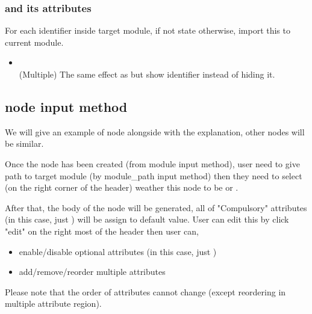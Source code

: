 \documentclass[11pt, a4paper]{article}
\begin{document}
\subsubsection{\kHideByDefault and its attributes}
For each identifier inside target module, if not state otherwise, import this to current module.
\begin{itemize}
    \item \kShow {} \\
    (Multiple) The same effect as \kHide but show identifier instead of hiding it.
\end{itemize}

\subsection{node input method}

We will give an example of \kOpen node alongside with the explanation, other nodes will be similar.

Once the \kOpen node has been created (from module input method), user need to give path to target module (by module\_path input method) then they need to select (on the right corner of the header) weather this \kOpen node to be \kShowByDefault or \kHideByDefault.

After that, the body of the node will be generated, all of "Compulsory" attributes (in this case, just \kRecursive) will be assign to default value. User can edit this by click "edit" on the right most of the header then user can,

\begin{itemize}
    \item enable/disable optional attributes (in this case, just \kComment) 
    \item add/remove/reorder multiple attributes
\end{itemize}

Please note that the order of attributes cannot change (except reordering in multiple attribute region).

\end{document}

